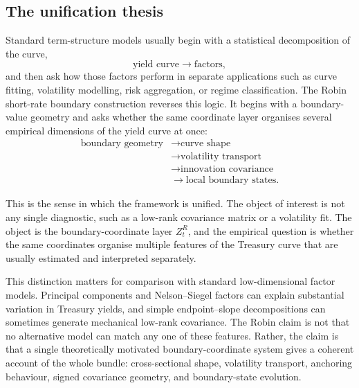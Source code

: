 \documentclass[11pt]{article}
\begin{document}
\subsection{The unification thesis}

Standard term-structure models usually begin with a statistical decomposition of the curve,
\[
    \text{yield curve} \longrightarrow \text{factors},
\]
and then ask how those factors perform in separate applications such as curve fitting, volatility modelling, risk aggregation, or regime classification. The Robin short-rate boundary construction reverses this logic. It begins with a boundary-value geometry and asks whether the same coordinate layer organises several empirical dimensions of the yield curve at once:
\[
\begin{aligned}
    \text{boundary geometry}
    &\longrightarrow \text{curve shape} \\
    &\longrightarrow \text{volatility transport} \\
    &\longrightarrow \text{innovation covariance} \\
    &\longrightarrow \text{local boundary states}.
\end{aligned}
\]

This is the sense in which the framework is unified. The object of interest is not any single diagnostic, such as a low-rank covariance matrix or a volatility fit. The object is the boundary-coordinate layer $Z_t^R$, and the empirical question is whether the same coordinates organise multiple features of the Treasury curve that are usually estimated and interpreted separately.

This distinction matters for comparison with standard low-dimensional factor models. Principal components and Nelson--Siegel factors can explain substantial variation in Treasury yields, and simple endpoint--slope decompositions can sometimes generate mechanical low-rank covariance. The Robin claim is not that no alternative model can match any one of these features. Rather, the claim is that a single theoretically motivated boundary-coordinate system gives a coherent account of the whole bundle: cross-sectional shape, volatility transport, anchoring behaviour, signed covariance geometry, and boundary-state evolution.
\end{document}
